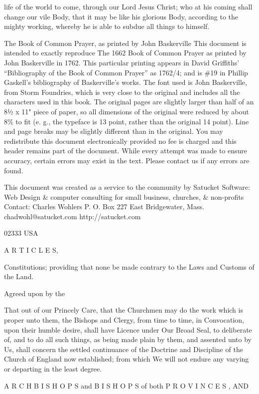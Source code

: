 life of the world to come, through our Lord Jesus Christ; who at his coming shall change our vile Body, that it may be like his glorious Body, according to the mighty working, whereby he is able to subdue all things to himself.


The Book of Common Prayer, as printed by John Baskerville This document is intended to exactly reproduce The 1662 Book of Common Prayer as printed by John Baskerville in 1762. This particular printing appears in David Griffiths' “Bibliography of the Book of Common Prayer” as 1762/4; and is \#19 in Phillip Gaskell's bibliography of Baskerville's works. The font used is John Baskerville, from Storm Foundries, which is very close to the original and includes all the characters used in this book. The original pages are slightly larger than half of an 8½ x 11" piece of paper, so all dimensions of the original were reduced by about 8\% to fit (e. g., the typeface is 13 point, rather than the original 14 point). Line and page breaks may be slightly different than in the original. You may redistribute this document electronically provided no fee is charged and this header remains part of the document. While every attempt was made to ensure accuracy, certain errors may exist in the text. Please contact us if any errors are found.

This document was created as a service to the community by Satucket Software: Web Design \& computer consulting for small business, churches, \& non-profits Contact: Charles Wohlers P. O. Box 227 East Bridgewater, Mass. chadwohl@satucket.com http://satucket.com

02333 USA

A R T I C L E S,

Constitutions; providing that none be made contrary to the Laws and Customs of the Land.

Agreed upon by the

That out of our Princely Care, that the Churchmen may do the work which is proper unto them, the Bishops and Clergy, from time to time, in Convocation, upon their humble desire, shall have Licence under Our Broad Seal, to deliberate of, and to do all such things, as being made plain by them, and assented unto by Us, shall concern the settled continuance of the Doctrine and Discipline of the Church of England now established; from which We will not endure any varying or departing in the least degree.

A R C H B I S H O P S and B I S H O P S of both P R O V I N C E S , AND

